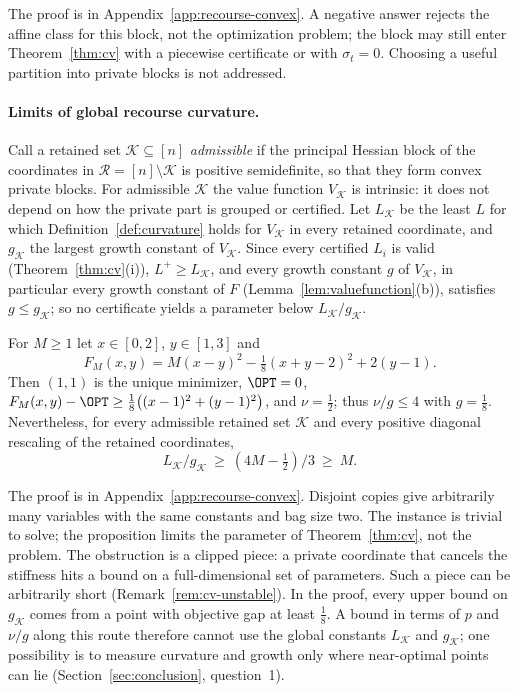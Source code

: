 The proof is in Appendix~\ref{app:recourse-convex}. A negative answer
rejects the affine class for this block, not the optimization problem; the
block may still enter Theorem~\ref{thm:cv} with a piecewise certificate or
with $\sigma_t=0$. Choosing a useful partition into private blocks is not
addressed.

\paragraph{Limits of global recourse curvature.}
Call a retained set $\mathcal K\subseteq[n]$ \emph{admissible} if the
principal Hessian block of the coordinates in $\mathcal R=[n]\setminus\mathcal K$
is positive semidefinite, so that they form convex private blocks. For
admissible $\mathcal K$ the value function $V_{\mathcal K}$ is intrinsic: it
does not depend on how the private part is grouped or certified. Let
$L_{\mathcal K}$ be the least $L$ for which Definition~\ref{def:curvature}
holds for $V_{\mathcal K}$ in every retained coordinate, and
$g_{\mathcal K}$ the largest growth constant of $V_{\mathcal K}$. Since every
certified $L_i$ is valid (Theorem~\ref{thm:cv}(i)), $L^+\ge L_{\mathcal K}$,
and every growth constant $g$ of $V_{\mathcal K}$, in particular every growth
constant of $F$ (Lemma~\ref{lem:valuefunction}(b)), satisfies
$g\le g_{\mathcal K}$; so no certificate yields a parameter below
$L_{\mathcal K}/g_{\mathcal K}$.

\begin{proposition}\label{prop:cv-limit}
For $M\ge1$ let $x\in[0,2]$, $y\in[1,3]$ and
\[
F_M(x,y)=M(x-y)^2-\tfrac18(x+y-2)^2+2(y-1).
\]
Then $(1,1)$ is the unique minimizer, $\OPT=0$,
$F_M(x,y)-\OPT\ge\frac18\bigl((x-1)^2+(y-1)^2\bigr)$, and $\nu=\frac12$; thus
$\nu/g\le4$ with $g=\frac18$. Nevertheless, for every admissible retained
set $\mathcal K$ and every positive diagonal rescaling of the retained
coordinates,
\[
L_{\mathcal K}/g_{\mathcal K}\ \ge\ (4M-\tfrac12)/3\ \ge\ M.
\]
\end{proposition}

The proof is in Appendix~\ref{app:recourse-convex}. Disjoint copies give
arbitrarily many variables with the same constants and bag size two. The
instance is trivial to solve; the proposition limits the parameter of
Theorem~\ref{thm:cv}, not the problem. The obstruction is a clipped piece: a
private coordinate that cancels the stiffness hits a bound on a
full-dimensional set of parameters. Such a piece can be arbitrarily short
(Remark~\ref{rem:cv-unstable}). In the proof, every upper bound on
$g_{\mathcal K}$ comes from a point with objective gap at least $\frac18$. A
bound in terms of $p$ and $\nu/g$ along this route therefore cannot use the
global constants $L_{\mathcal K}$ and $g_{\mathcal K}$; one possibility is to
measure curvature and growth only where near-optimal points can lie
(Section~\ref{sec:conclusion}, question~1).
